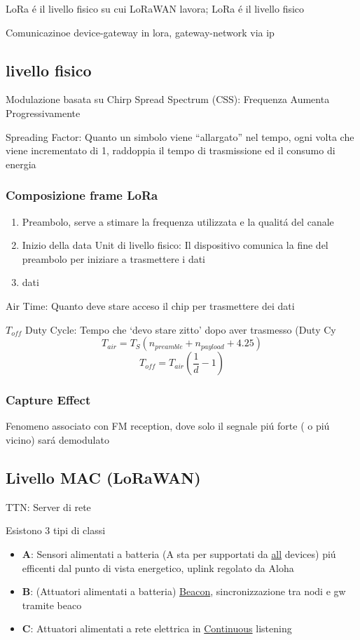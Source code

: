 \documentclass{article}
\begin{document}
LoRa \'e il livello fisico su cui LoRaWAN lavora; LoRa \'e il livello fisico

Comunicazinoe device-gateway in lora, gateway-network via ip

\subsection{livello fisico}
Modulazione basata su Chirp Spread Spectrum (CSS): Frequenza Aumenta Progressivamente

Spreading Factor: Quanto un simbolo viene ``allargato'' nel tempo, ogni volta che viene incrementato di 1, raddoppia il tempo di trasmissione ed il consumo di energia

\subsubsection{Composizione frame LoRa}
\begin{enumerate}
    \item Preambolo, serve a stimare la frequenza utilizzata e la qualit\'a del canale
    \item  Inizio della data Unit di livello fisico: Il dispositivo comunica la fine del preambolo per iniziare a trasmettere i dati
    \item  dati
\end{enumerate}

Air Time: Quanto deve stare acceso il chip per trasmettere dei dati

$T_{off}$ Duty Cycle: Tempo che `devo stare zitto' dopo aver trasmesso (Duty Cy
\[ T_{air} = T_S (n_{preamble} + n_{payload} + 4.25 )\]
\[ T_{off} = T_{air} \left( \frac{1}{d} -1 \right) \]

\subsubsection{Capture Effect}
Fenomeno associato con FM reception, dove solo il segnale pi\'u forte ( o pi\'u vicino) sar\'a demodulato

\subsection{Livello MAC (LoRaWAN)}
TTN: Server di rete

Esistono 3 tipi di classi
\begin{itemize}
    \item \textbf{A}: Sensori alimentati a batteria (A sta per supportati da \underline{all} devices) pi\'u efficenti dal punto di vista energetico, uplink regolato da Aloha
    \item \textbf{B}: (Attuatori alimentati a batteria) \underline{Beacon}, sincronizzazione tra nodi e gw tramite beaco
    \item \textbf{C}: Attuatori alimentati a rete elettrica in \underline{Continuous} listening
\end{itemize}
\end{document}
